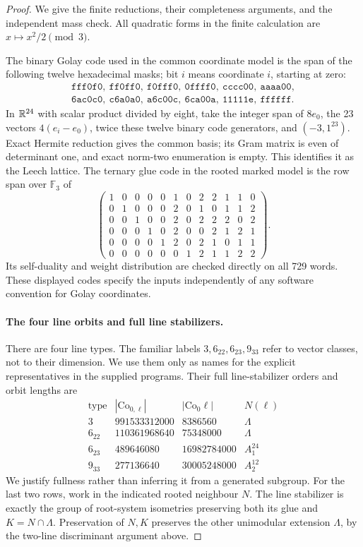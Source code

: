 \begin{proof}
We give the finite reductions, their completeness arguments, and the
independent mass check. All quadratic forms in the finite calculation
are \(x\mapsto x^2/2\pmod3\).

The binary Golay code used in the common coordinate model is the
span of the following twelve hexadecimal masks; bit \(i\) means
coordinate \(i\), starting at zero:
\[
\begin{gathered}
\mathtt{fff0f0},\ \mathtt{ff0ff0},\ \mathtt{f0fff0},\
\mathtt{0ffff0},\ \mathtt{cccc00},\ \mathtt{aaaa00},\\
\mathtt{6ac0c0},\ \mathtt{c6a0a0},\ \mathtt{a6c00c},\
\mathtt{6ca00a},\ \mathtt{11111e},\ \mathtt{ffffff}.
\end{gathered}
\]
In \(\mathbb R^{24}\) with scalar product divided by eight, take the
integer span of \(8e_0\), the 23 vectors \(4(e_i-e_0)\), twice
these twelve binary code generators, and \((-3,1^{23})\).
Exact Hermite reduction gives the common basis; its Gram matrix is
even of determinant one, and exact norm-two enumeration is empty.
This identifies it as the Leech lattice. The ternary glue code in
the rooted marked model is the row span over \(\mathbb F_3\) of
\[
\begin{pmatrix}
1&0&0&0&0&1&0&2&2&1&1&0\\
0&1&0&0&0&2&0&1&0&1&1&2\\
0&0&1&0&0&2&0&2&2&2&0&2\\
0&0&0&1&0&2&0&0&2&1&2&1\\
0&0&0&0&1&2&0&2&1&0&1&1\\
0&0&0&0&0&0&1&2&1&1&2&2
\end{pmatrix}.
\]
Its self-duality and weight distribution are checked directly on
all 729 words. These displayed codes specify the inputs independently
of any software convention for Golay coordinates.

\paragraph{The four line orbits and full line stabilizers.}
There are four line types. The familiar labels \(3,6_{22},6_{23},9_{33}\)
refer to vector classes, not to their dimension. We use them only as
names for the explicit representatives in the supplied programs.
Their full line-stabilizer orders and orbit lengths are
\[
\begin{array}{c|r|r|c}
\text{type}&|\mathrm{Co}_{0,\ell}|&|\mathrm{Co}_0\ell|&N(\ell)\\\hline
3&991533312000&8386560&\Lambda\\
6_{22}&110361968640&75348000&\Lambda\\
6_{23}&489646080&16982784000&A_1^{24}\\
9_{33}&277136640&30005248000&A_2^{12}
\end{array}
\]
We justify fullness rather than inferring it from a generated subgroup.
For the last two rows, work in the indicated rooted neighbour \(N\).
The line stabilizer is exactly the group of root-system isometries
preserving both its glue and \(K=N\cap\Lambda\). Preservation of
\(N,K\) preserves the other unimodular extension \(\Lambda\), by
the two-line discriminant argument above.


\end{proof}

